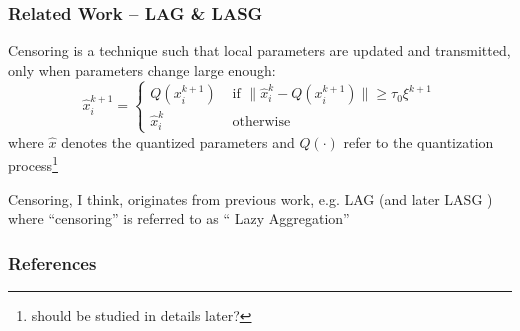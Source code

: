 
\begin{frame}
\frametitle{Related Work -- LAG \& LASG}

Censoring is a technique such that local parameters are updated and transmitted, only when parameters change large enough:
\begin{equation*}
    \widehat{x}_i^{k+1} = \begin{cases} Q(x_i^{k+1}) & \text{ if } \lVert \widehat{x}_i^{k}-Q(x_i^{k+1}) \rVert \geqslant \tau_0\xi^{k+1} \\ \widehat{x}_i^{k} & \text{ otherwise} \end{cases}
\end{equation*}
where $\widehat{x}$ denotes the quantized parameters and $Q(\cdot)$ refer to the quantization process\footnote{should be studied in details later?}

\pause
\vspace{0.6em}

Censoring, I think, originates from previous work, e.g. LAG \cite{chen2018lag} (and later LASG \cite{chen2020lasg}) where ``censoring'' is referred to as ``{\color{red} L}azy {\color{red} A}ggregation''

\end{frame}






\begin{frame}[allowframebreaks]
\frametitle{References}

{\footnotesize


}

\end{frame}



